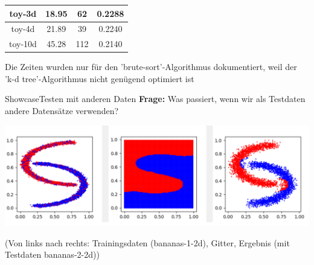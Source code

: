 \documentclass[9pt]{beamer}
\begin{document}
\begin{frame}
\begin{center}
\begin{tabular}{|c|c|c|c|}
\hline

 toy-3d &18.95 &62 &0.2288\\

\hline

toy-4d  &21.89 &39 &0.2240\\

\hline

toy-10d  &45.28 &112 &0.2140\\

\hline


\end{tabular}
\end{center}
Die Zeiten wurden nur für den 'brute-sort'-Algorithmus dokumentiert, weil der 'k-d tree'-Algorithmus nicht genügend optimiert ist
\end{frame}

\begin{frame}{Showcase}{Testen mit anderen Daten}
\textbf{Frage:} Was passiert, wenn wir als Testdaten andere Datensätze verwenden?
\begin{center}\includegraphics[scale=0.25]{assets/changed_test_data.png}\end{center}
\begin{center}\begin{tiny}(Von links nach rechts: Trainingsdaten (bananas-1-2d), Gitter, Ergebnis (mit Testdaten bananas-2-2d))\end{tiny}\end{center}

\end{frame}
\end{document}
